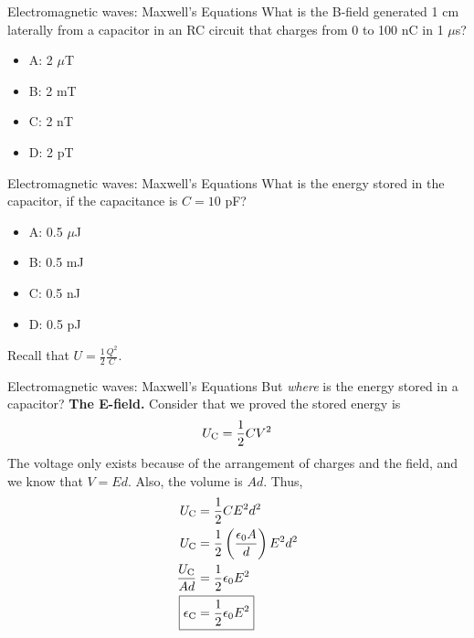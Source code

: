 \documentclass{beamer}
\begin{document}
\begin{frame}{Electromagnetic waves: Maxwell's Equations}
What is the B-field generated 1 cm laterally from a capacitor in an RC circuit that charges from 0 to 100 nC in 1 $\mu$s?
\begin{itemize}
\item A: 2 $\mu$T
\item B: 2 mT
\item C: 2 nT
\item D: 2 pT
\end{itemize}
\end{frame}

\begin{frame}{Electromagnetic waves: Maxwell's Equations}
What is the energy stored in the capacitor, if the capacitance is $C = 10$ pF?
\begin{itemize}
\item A: 0.5 $\mu$J
\item B: 0.5 mJ
\item C: 0.5 nJ
\item D: 0.5 pJ
\end{itemize}
\small
Recall that $U = \frac{1}{2} \frac{Q^2}{C}$.
\end{frame}

\begin{frame}{Electromagnetic waves: Maxwell's Equations}
\small
But \textit{where} is the energy stored in a capacitor?  \textbf{The E-field.}  Consider that we proved the stored energy is
\begin{equation}
U_{\rm C} = \frac{1}{2} C V^2
\end{equation}
The voltage only exists because of the arrangement of charges and the field, and we know that $V = E d$.  Also, the volume is $Ad$.  Thus,
\begin{align}
U_{\rm C} &= \frac{1}{2}C E^2 d^2 \\
U_{\rm C} &= \frac{1}{2}\left(\frac{\epsilon_0 A}{d}\right) E^2 d^2 \\
\frac{U_{\rm C}}{Ad} &= \frac{1}{2}\epsilon_0 E^2 \\
\Aboxed{\epsilon_{\rm C} &= \frac{1}{2}\epsilon_0 E^2}
\end{align}
\end{frame}
\end{document}
